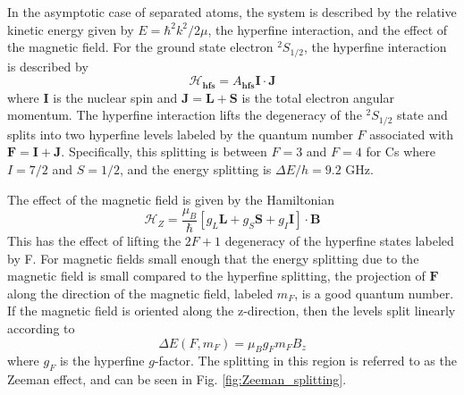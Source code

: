 \documentclass[prl,onecolumn,amsmath,amssymb,titlepage,nofootinbib,preprint]{revtex4-1}
\begin{document}

In the asymptotic case of separated atoms, the system is described by the relative kinetic energy given by $E=\hbar^{2}k^{2}/2\mu$, the hyperfine interaction, and the effect of the magnetic field.  For the ground state electron $^{2}S_{1/2}$, the hyperfine interaction is described by
	\begin{equation}\label{eq:hyperfine_hamiltonian}
	\mathcal{H}_{\textbf{hfs}} = A_{\textbf{hfs}}\mathbf{I}\cdot\mathbf{J}
	\end{equation}
where $\mathbf{I}$ is the nuclear spin and $\mathbf{J}=\mathbf{L}+\mathbf{S}$ is the total electron angular momentum. The hyperfine interaction lifts the degeneracy of the $^{2}S_{1/2}$ state and splits into two hyperfine levels labeled by the quantum number $F$ associated with $\mathbf{F}=\mathbf{I}+\mathbf{J}$.  Specifically, this splitting is between $F=3$ and $F=4$ for Cs where $I=7/2$ and $S=1/2$, and the energy splitting is $\Delta E/h=9.2\text{ GHz}$.

The effect of the magnetic field is given by the Hamiltonian
\begin{equation}\label{eq:zeeeman}
	\mathcal{H}_{Z} = \frac{\mu_{B}}{\hbar}[g_{L}\mathbf{L} + g_{S}\mathbf{S} + g_{I}\mathbf{I}]\cdot\mathbf{B}
\end{equation}
This has the effect of lifting the $2F+1$ degeneracy of the hyperfine states labeled by F.  For magnetic fields small enough that the energy splitting due to the magnetic field is small compared to the hyperfine splitting, the projection of $\mathbf{F}$ along the direction of the magnetic field, labeled $m_{F}$, is a good quantum number. If the magnetic field is oriented along the z-direction, then the levels split linearly according to
\begin{equation}
	\Delta E(F,m_{F})=\mu_{B}g_{F}m_{F}B_{z}
\end{equation}
where $g_{F}$ is the hyperfine $g$-factor.  The splitting in this region is referred to as the Zeeman effect, and can be seen in Fig. \ref{fig:Zeeman_splitting}. 
\end{document}
